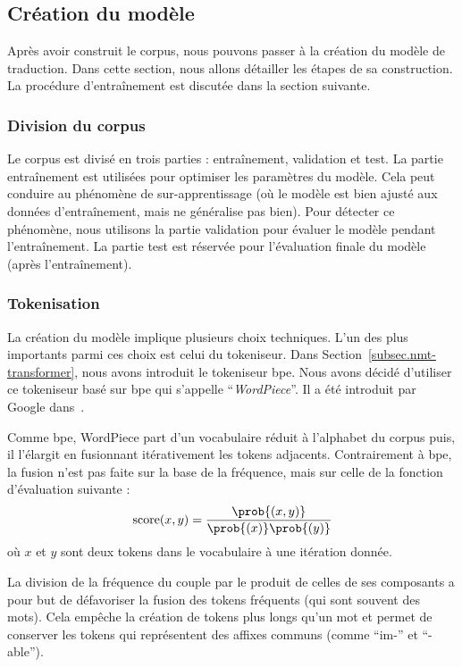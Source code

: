 \subsection{Création du modèle}

Après avoir construit le corpus, nous pouvons passer à la création du modèle de traduction.
Dans cette section, nous allons détailler les étapes de sa construction.
La procédure d'entraînement est discutée dans la section suivante.

\subsubsection{Division du corpus}

Le corpus est divisé en trois parties : entraînement, validation et test.
La partie entraînement est utilisées pour optimiser les paramètres du modèle.
Cela peut conduire au phénomène de sur-apprentissage 
(où le modèle est bien ajusté aux données d'entraînement, mais ne généralise pas bien).
Pour détecter ce phénomène, nous utilisons la partie validation pour évaluer le modèle pendant l'entraînement.
La partie test est réservée pour l'évaluation finale du modèle (après l'entraînement).

\subsubsection{Tokenisation}

La création du modèle implique plusieurs choix techniques.
L'un des plus importants parmi ces choix est celui du tokeniseur.
Dans Section~\ref{subsec.nmt-transformer}, 
nous avons introduit le tokeniseur \gls{bpe}.
Nous avons décidé d'utiliser ce tokeniseur basé sur \gls{bpe} qui s'appelle ``\emph{WordPiece}''.
Il a été introduit par Google dans~\cite{Devlin_Chang_Lee_Touta11a_2019}.

Comme \gls{bpe}, WordPiece part d'un vocabulaire réduit à l'alphabet du corpus
puis, il l'élargit en fusionnant itérativement les tokens adjacents.
Contrairement à \gls{bpe}, la fusion n'est pas faite sur la base de la fréquence,
mais sur celle de la fonction d'évaluation suivante :
\begin{equation}
    \label{eq.wp-score}
    \mathrm{score}(x, y) = \frac{\prob{(x, y)}}{\prob{(x)} \prob{(y)}}
\end{equation}
où \(x\) et \(y\) sont deux tokens dans le vocabulaire à une itération donnée.

La division de la fréquence du couple par le produit de celles de ses composants
a pour but de défavoriser la fusion des tokens fréquents (qui sont souvent des mots).
Cela empêche la création de tokens plus longs qu'un mot et permet de conserver les tokens
qui représentent des affixes communs (comme ``im-'' et ``-able'').


